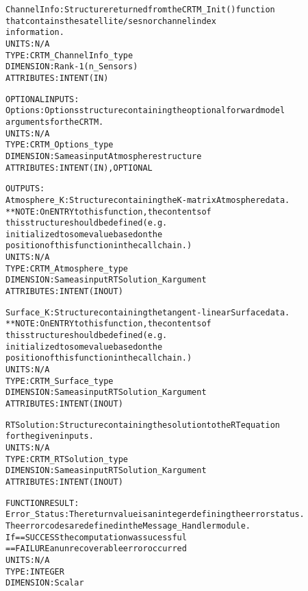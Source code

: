 \begin{alltt}
        ChannelInfo:    Structure returned from the CRTM_Init() function
                        that contains the satellite/sesnor channel index
                        information.
                        UNITS:      N/A
                        TYPE:       CRTM_ChannelInfo_type
                        DIMENSION:  Rank-1 (n_Sensors)
                        ATTRIBUTES: INTENT(IN)
 
  OPTIONAL INPUTS:
        Options:        Options structure containing the optional forward model
                        arguments for the CRTM.
                        UNITS:      N/A
                        TYPE:       CRTM_Options_type
                        DIMENSION:  Same as input Atmosphere structure
                        ATTRIBUTES: INTENT(IN), OPTIONAL
 
  OUTPUTS:
        Atmosphere_K:   Structure containing the K-matrix Atmosphere data.
                        **NOTE: On ENTRY to this function, the contents of
                                this structure should be defined (e.g.
                                initialized to some value based on the
                                position of this function in the call chain.)
                        UNITS:      N/A
                        TYPE:       CRTM_Atmosphere_type
                        DIMENSION:  Same as input RTSolution_K argument
                        ATTRIBUTES: INTENT(IN OUT)
 
        Surface_K:      Structure containing the tangent-linear Surface data.
                        **NOTE: On ENTRY to this function, the contents of
                                this structure should be defined (e.g.
                                initialized to some value based on the
                                position of this function in the call chain.)
                        UNITS:      N/A
                        TYPE:       CRTM_Surface_type
                        DIMENSION:  Same as input RTSolution_K argument
                        ATTRIBUTES: INTENT(IN OUT)
 
        RTSolution:     Structure containing the solution to the RT equation
                        for the given inputs.
                        UNITS:      N/A
                        TYPE:       CRTM_RTSolution_type
                        DIMENSION:  Same as input RTSolution_K argument
                        ATTRIBUTES: INTENT(IN OUT)
 
  FUNCTION RESULT:
        Error_Status:   The return value is an integer defining the error status.
                        The error codes are defined in the Message_Handler module.
                        If == SUCCESS the computation was sucessful
                           == FAILURE an unrecoverable error occurred
                        UNITS:      N/A
                        TYPE:       INTEGER
                        DIMENSION:  Scalar
 

\end{alltt}
